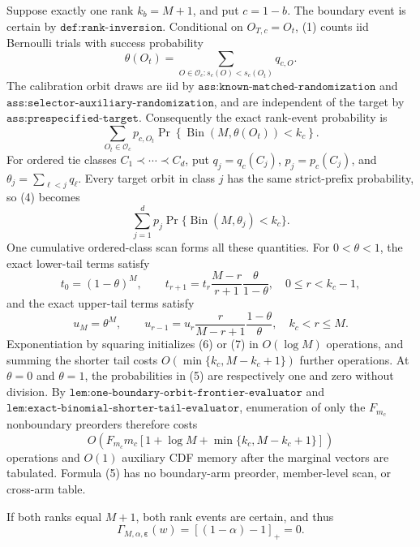 Suppose exactly one rank \(k_b=M+1\), and put \(c=1-b\). The boundary event is certain by \(\texttt{def:rank-inversion}\). Conditional on \(O_{T,c}=O_t\), (1) counts iid Bernoulli trials with success probability
\[
\theta(O_t)=\sum_{O\in\mathcal O_c:s_c(O)<s_c(O_t)}q_{c,O}.
\tag{3}
\]
The calibration orbit draws are iid by \(\texttt{ass:known-matched-randomization}\) and \(\texttt{ass:selector-auxiliary-randomization}\), and are independent of the target by \(\texttt{ass:prespecified-target}\). Consequently the exact rank-event probability is
\[
\sum_{O_t\in\mathcal O_c}p_{c,O_t}\Pr\!\left\{\operatorname{Bin}(M,\theta(O_t))<k_c\right\}.
\tag{4}
\]
For ordered tie classes \(C_1\prec\cdots\prec C_d\), put \(q_j=q_c(C_j)\), \(p_j=p_c(C_j)\), and \(\theta_j=\sum_{\ell<j}q_\ell\). Every target orbit in class \(j\) has the same strict-prefix probability, so (4) becomes
\[
\sum_{j=1}^d p_j\Pr\{\operatorname{Bin}(M,\theta_j)<k_c\}.
\tag{5}
\]
One cumulative ordered-class scan forms all these quantities. For \(0<\theta<1\), the exact lower-tail terms satisfy
\[
t_0=(1-\theta)^M,\qquad t_{r+1}=t_r\frac{M-r}{r+1}\frac{\theta}{1-\theta},\quad 0\le r<k_c-1,
\tag{6}
\]
and the exact upper-tail terms satisfy
\[
u_M=\theta^M,\qquad u_{r-1}=u_r\frac r{M-r+1}\frac{1-\theta}{\theta},\quad k_c<r\le M.
\tag{7}
\]
Exponentiation by squaring initializes (6) or (7) in \(O(\log M)\) operations, and summing the shorter tail costs \(O(\min\{k_c,M-k_c+1\})\) further operations. At \(\theta=0\) and \(\theta=1\), the probabilities in (5) are respectively one and zero without division. By \(\texttt{lem:one-boundary-orbit-frontier-evaluator}\) and \(\texttt{lem:exact-binomial-shorter-tail-evaluator}\), enumeration of only the \(F_{m_c}\) nonboundary preorders therefore costs
\[
O\!\left(F_{m_c}m_c[1+\log M+\min\{k_c,M-k_c+1\}]\right)
\tag{8}
\]
operations and \(O(1)\) auxiliary CDF memory after the marginal vectors are tabulated. Formula (5) has no boundary-arm preorder, member-level scan, or cross-arm table.

If both ranks equal \(M+1\), both rank events are certain, and thus
\[
\Gamma_{M,\alpha,\boldsymbol\varepsilon}(w)=[(1-\alpha)-1]_+=0.
\tag{9}
\]


